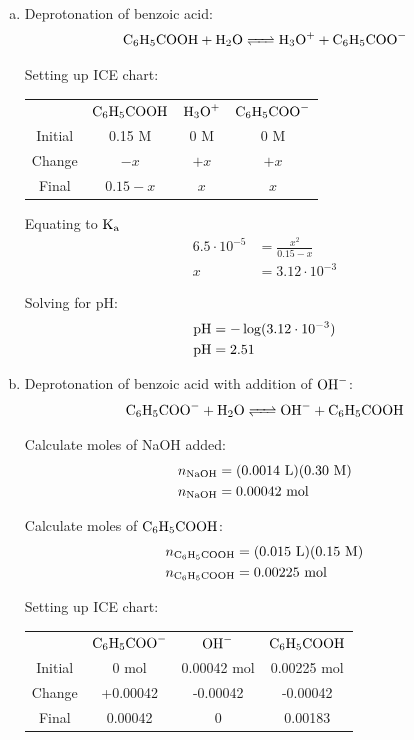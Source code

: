 \documentclass{article}
\begin{document}
\begin{enumerate}[(a)]
    \item Deprotonation of benzoic acid:
        $$\ce{C_6H_5COOH + H_2O <=> H_3O+ + C_6H_5COO-}$$

        Setting up ICE chart:
        \begin{center}
            \begin{tabular}{c c c c}
                & $\ce{C_6H_5COOH}$ & $\ce{H_3O+}$ & $\ce{C_6H_5COO-}$ \\
                Initial & 0.15 M & 0 M & 0 M \\
                Change & $-x$ & $+x$ & $+x$ \\
                Final & $0.15 - x$ & $x$ & $x$
            \end{tabular}
        \end{center}

        Equating to $\rm{K_a}$
        \begin{align*}
            6.5 \cdot 10^{-5} &= \frac{x^2}{0.15 - x} \\
            x &= 3.12 \cdot 10^{-3}
        \end{align*}

        Solving for pH:
        \begin{align*}
            \rm{pH} &= -\log(3.12 \cdot 10^{-3}) \\
            \rm{pH} &= 2.51
        \end{align*}

    \item Deprotonation of benzoic acid with addition of $\ce{OH-}$:
        $$\ce{C_6H_5COO- + H_2O <=> OH- + C_6H_5COOH}$$

        Calculate moles of NaOH added:
        \begin{align*}
            n_{\ce{NaOH}} &= (0.0014\ \si{L})(0.30\ \si{M}) \\
            n_{\ce{NaOH}} &= 0.00042\ \si{mol}
        \end{align*}

        Calculate moles of $\ce{C_6H_5COOH}$:
        \begin{align*}
            n_{\ce{C_6H_5COOH}} &= (0.015\ \si{L})(0.15\ \si{M}) \\
            n_{\ce{C_6H_5COOH}} &= 0.00225\ \si{mol}
        \end{align*}

        Setting up ICE chart:
        \begin{center}
            \begin{tabular}{c c c c}
                & $\ce{C_6H_5COO-}$ & $\ce{OH-}$ & $\ce{C_6H_5COOH}$ \\
                Initial & 0 mol & 0.00042 mol  & 0.00225 mol \\
                Change & +0.00042 & -0.00042 & -0.00042 \\
                Final & 0.00042 & 0 & 0.00183
            \end{tabular}
        \end{center}


\end{enumerate}
\end{document}
